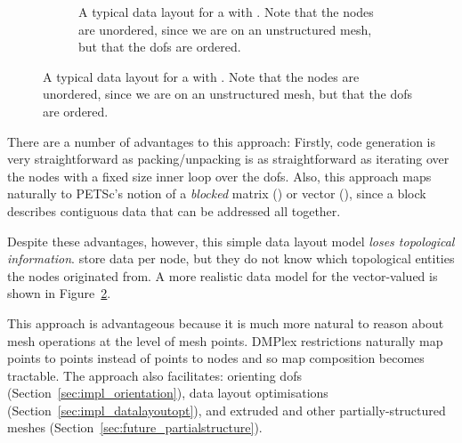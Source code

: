 \begin{figure}
\begin{subfigure}{0.48\textwidth}
    \caption{
      A typical   data layout for a  with  .
      Note that the nodes are unordered, since we are on an unstructured mesh, but that the \glspl{dof} are ordered.
    }
    \label{fig:vdat_pyop3}
  \end{subfigure}
\end{figure}

There are a number of advantages to this approach:
Firstly, code generation is very straightforward as packing/unpacking is as straightforward as iterating over the nodes with a fixed size inner loop over the \glspl{dof}.
Also, this approach maps naturally to PETSc's notion of a \textit{blocked} matrix () or vector (), since a block describes contiguous data that can be addressed all together.

Despite these advantages, however, this simple data layout model \textit{loses topological information}.
  store data per node, but they do not know which topological entities the nodes originated from.
A more realistic data model for the vector-valued  is shown in Figure~\ref{fig:vdat_pyop3}.

This approach is advantageous because it is much more natural to reason about mesh operations at the level of mesh points.
DMPlex restrictions naturally map points to points instead of points to nodes and so map composition becomes tractable.
The approach also facilitates: orienting \glspl{dof} (Section~\ref{sec:impl_orientation}), data layout optimisations (Section~\ref{sec:impl_datalayoutopt}), and extruded and other partially-structured meshes (Section~\ref{sec:future_partialstructure}).



